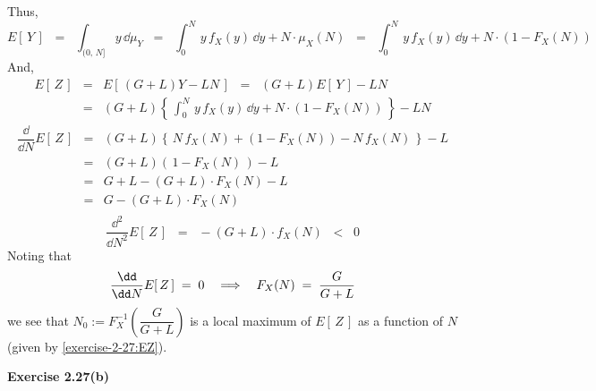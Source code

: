 Thus,
\begin{equation*}
E[\,Y\,]
\;\;=\;\; \int_{(0,\,N]}y\,\dd\mu_{Y}
\;\;=\;\; \int_{0}^{N}\,y\,f_{X}(y)\,\dd y + N\cdot\mu_{X}(N)
\;\;=\;\; \int_{0}^{N}\,y\,f_{X}(y)\,\dd y + N\cdot(1-F_{X}(N))
\end{equation*}
And,
\begin{eqnarray}
E[\,Z\,]
&=&        E[\,(G+L)Y - LN\,]
\;\;=\;\; (G+L)E[\,Y\,] - LN
\\
&=&       (G+L)\left\{\,\int_{0}^{N}\,y\,f_{X}(y)\,\dd y + N\cdot(1-F_{X}(N))\,\right\} - LN
\label{exercise-2-27:EZ}
\end{eqnarray}
\begin{eqnarray*}
\dfrac{\dd}{\dd N}E[\,Z\,]
&=& (G+L)\left\{\,N\,f_{X}(N) + (1-F_{X}(N)) - N\,f_{X}(N)\,\right\} - L \\
&=& (G+L)\left(\,1-F_{X}(N)\,\right) - L \\
&=& G + L - (G+L) \cdot F_{X}(N) - L \\
&=& G - (G+L) \cdot F_{X}(N) \\
\end{eqnarray*}
\begin{equation*}
\dfrac{\dd^{2}}{\dd N^{2}}E[\,Z\,]
\;\;=\;\; - (G+L) \cdot f_{X}(N) \;\; < \;\; 0
\end{equation*}
Noting that
\begin{equation*}
\dfrac{\dd}{\dd N}E[\,Z\,] \;=\; 0
\quad\Longrightarrow\quad
F_{X}(N) \;=\; \dfrac{G}{G+L} \\
\end{equation*}
we see that $N_{0} := F_{X}^{-1}\left(\dfrac{G}{G+L}\right)$ is a local maximum
of $E[\,Z\,]$ as a function of $N$ (given by \eqref{exercise-2-27:EZ}).

\vskip 1.0cm
\noindent
\textbf{Exercise 2.27(b)}

